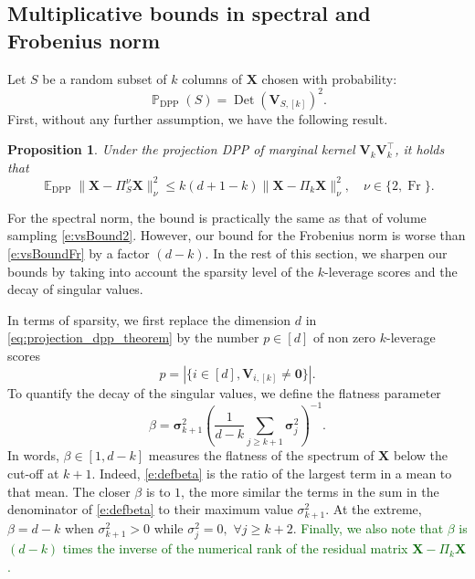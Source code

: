 \documentclass[twoside,11pt]{book}
\newcommand{\rev}[1]{\textcolor{darkgreen}{#1}}
\newtheorem{proposition}{Proposition}
\numberwithin{theorem}{chapter}
\numberwithin{definition}{chapter}
\numberwithin{proposition}{chapter}
\numberwithin{corollary}{chapter}
\numberwithin{example}{chapter}
\numberwithin{lemma}{chapter}
\DeclareMathOperator{\Det}{Det}
\DeclareMathOperator{\Fr}{\mathrm{Fr}}
\DeclareMathOperator{\DPP}{\mathrm{DPP}}
\DeclareMathOperator{\Tran}{\intercal}
\DeclareMathOperator{\EX}{\mathbb{E}}
\DeclareMathOperator{\Prb}{\mathbb{P}}
\begin{document}
\subsection{Multiplicative bounds in spectral and Frobenius norm}
\label{sec:new_results_randomized}
Let $S$ be a random subset of $k$ columns of $\bm{X}$ chosen with probability:
\begin{equation}
	\Prb_{\DPP}(S) = \Det(\bm{V}_{S,[k]})^{2}.
\end{equation}
First, without any further assumption, we have the following result.
\begin{proposition}
    \label{projection_dpp_theorem}
    Under the projection DPP of marginal kernel $\bm{V}^{}_{k}\bm{V}^{\Tran}_{k}$, it holds that
    \begin{equation}
    	\label{eq:projection_dpp_theorem}
    	\EX_{\DPP} \| \bm{X} - \Pi_{S}^{\nu}\bm{X} \|_{\nu}^{2} \leq k(d+1-k)\| \bm{X} - \Pi_{k}\bm{X} \|_{\nu}^{2}, \quad \nu\in\{2,\Fr\}.
    \end{equation}
\end{proposition}
For the spectral norm, the bound is practically the same as that of volume sampling \eqref{e:vsBound2}. However, our bound for the Frobenius norm is worse than \eqref{e:vsBoundFr} by a factor $(d-k)$. In the rest of this section, we sharpen our bounds by taking into account the sparsity level of the $k$-leverage scores and the decay of singular values.

In terms of sparsity, we first replace the dimension $d$ in \eqref{eq:projection_dpp_theorem} by the number $p\in[d]$ of non zero $k$-leverage scores
\begin{equation}
  p = \left| \{i \in [d], \bm{V}_{i,[k]} \neq \bm{0}\}\right|.
  \label{e:defp}
\end{equation}
To quantify the decay of the singular values, we define the flatness parameter
\begin{equation}
  \beta = \bm{\sigma}_{k+1}^{2} \left(\frac{1}{d-k} \sum\limits_{j \geq k+1} \bm{\sigma}_{j}^{2}\right)^{-1}.
  \label{e:defbeta}
\end{equation}
In words, $\beta\in[1,d-k]$ measures the flatness of the spectrum of $\bm{X}$ below the cut-off at $k+1$. Indeed, \eqref{e:defbeta} is the ratio of the largest term in a mean to that mean. The closer $\beta$ is to $1$, the more similar the terms in the sum in the denominator of \eqref{e:defbeta} to their maximum value $\sigma_{k+1}^{2}$. At the extreme, $\beta=d-k$ when $\sigma^2_{k+1}>0$ while $\sigma_j^2=0,$ $\forall j\geq k+2$. \rev{Finally, we also note that $\beta$ is $(d-k)$ times the inverse of the numerical rank \citep{RuVe07} of the residual matrix $\bm{X}-\Pi_{k}\bm{X}$.}
\end{document}
